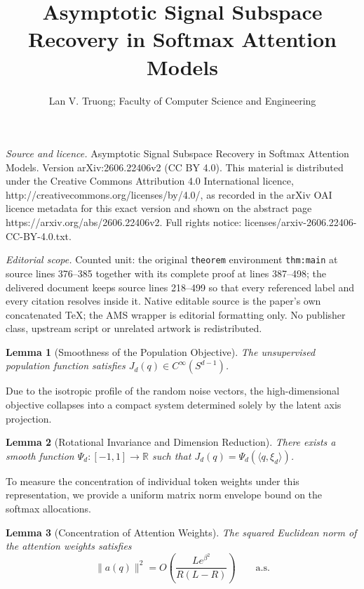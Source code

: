 \documentclass[10pt,a4paper]{amsart}
\newtheorem{lemma}{Lemma}
\begin{document}
\title[Asymptotic Signal Subspace Recovery in Softmax Attention Mod]{Asymptotic Signal Subspace Recovery in Softmax Attention Models}
\author{Lan V. Truong; Faculty of Computer Science and Engineering}
\date{}
\maketitle
\noindent\emph{Source and licence.} Asymptotic Signal Subspace Recovery in Softmax Attention Models. Version arXiv:2606.22406v2 (CC BY 4.0). This material is distributed under the Creative Commons Attribution 4.0 International licence, http://creativecommons.org/licenses/by/4.0/, as recorded in the arXiv OAI licence metadata for this exact version and shown on the abstract page https://arxiv.org/abs/2606.22406v2. Full rights notice: licenses/arxiv-2606.22406-CC-BY-4.0.txt.\par\smallskip
\noindent\textit{Editorial scope.} Counted unit: the original \texttt{theorem} environment \texttt{thm:main} at source lines 376--385 together with its complete proof at lines 387--498; the delivered document keeps source lines 218--499 so that every referenced label and every citation resolves inside it. Native editable source is the paper's own concatenated TeX; the AMS wrapper is editorial formatting only. No publisher class, upstream script or unrelated artwork is redistributed.
\begin{lemma}[Smoothness of the Population Objective] \label{lem:lem1}
The unsupervised population function satisfies $J_{d}(q) \in C^{\infty}(S^{d-1})$.
\end{lemma}

\noindent Due to the isotropic profile of the random noise vectors, the high-dimensional objective collapses into a compact system determined solely by the latent axis projection.

\begin{lemma}[Rotational Invariance and Dimension Reduction] \label{lem:lem2}
There exists a smooth function $\Psi_{d}:[-1,1] \rightarrow \mathbb{R}$ such that $J_{d}(q) = \Psi_{d}(\langle q, \xi_{d} \rangle)$.
\end{lemma}

\noindent To measure the concentration of individual token weights under this representation, we provide a uniform matrix norm envelope bound on the softmax allocations.

\begin{lemma}[Concentration of Attention Weights] \label{lem:lem3}
The squared Euclidean norm of the attention weights satisfies 
\begin{equation}
    \|a(q)\|^2 =O\left( \frac{L e^{\beta^2} }{R(L-R)}\right) \qquad\text{a.s.}
\end{equation}
\end{lemma}
\end{document}
